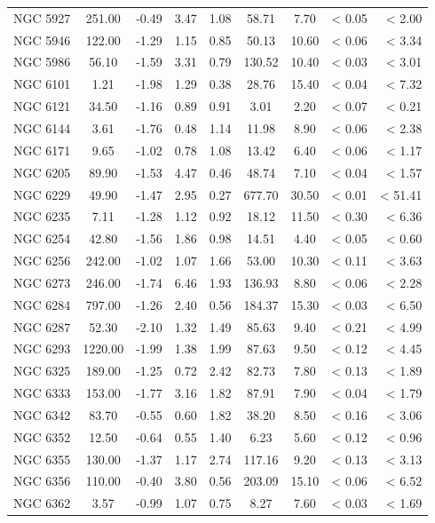 \documentclass[doublespace,nopageskip]{VTthesis} %
\begin{document}
\begin{appendices}
\begin{table}
\begin{tabular}{lcccccccr}
NGC 5927 & 251.00 & -0.49 & 3.47 & 1.08 & 58.71 & 7.70 & < 0.05 & < 2.00\\
NGC 5946 & 122.00 & -1.29 & 1.15 & 0.85 & 50.13 & 10.60 & < 0.06 & < 3.34\\
NGC 5986 & 56.10 & -1.59 & 3.31 & 0.79 & 130.52 & 10.40 & < 0.03 & < 3.01\\
NGC 6101 & 1.21 & -1.98 & 1.29 & 0.38 & 28.76 & 15.40 & < 0.04 & < 7.32\\
NGC 6121 & 34.50 & -1.16 & 0.89 & 0.91 & 3.01 & 2.20 & < 0.07 & < 0.21\\
NGC 6144 & 3.61 & -1.76 & 0.48 & 1.14 & 11.98 & 8.90 & < 0.06 & < 2.38\\
NGC 6171 & 9.65 & -1.02 & 0.78 & 1.08 & 13.42 & 6.40 & < 0.06 & < 1.17\\
NGC 6205 & 89.90 & -1.53 & 4.47 & 0.46 & 48.74 & 7.10 & < 0.04 & < 1.57\\
NGC 6229 & 49.90 & -1.47 & 2.95 & 0.27 & 677.70 & 30.50 & < 0.01 & < 51.41\\
NGC 6235 & 7.11 & -1.28 & 1.12 & 0.92 & 18.12 & 11.50 & < 0.30 & < 6.36\\
NGC 6254 & 42.80 & -1.56 & 1.86 & 0.98 & 14.51 & 4.40 & < 0.05 & < 0.60\\
NGC 6256 & 242.00 & -1.02 & 1.07 & 1.66 & 53.00 & 10.30 & < 0.11 & < 3.63\\
NGC 6273 & 246.00 & -1.74 & 6.46 & 1.93 & 136.93 & 8.80 & < 0.06 & < 2.28\\
NGC 6284 & 797.00 & -1.26 & 2.40 & 0.56 & 184.37 & 15.30 & < 0.03 & < 6.50\\
NGC 6287 & 52.30 & -2.10 & 1.32 & 1.49 & 85.63 & 9.40 & < 0.21 & < 4.99\\
NGC 6293 & 1220.00 & -1.99 & 1.38 & 1.99 & 87.63 & 9.50 & < 0.12 & < 4.45\\
NGC 6325 & 189.00 & -1.25 & 0.72 & 2.42 & 82.73 & 7.80 & < 0.13 & < 1.89\\
NGC 6333 & 153.00 & -1.77 & 3.16 & 1.82 & 87.91 & 7.90 & < 0.04 & < 1.79\\
NGC 6342 & 83.70 & -0.55 & 0.60 & 1.82 & 38.20 & 8.50 & < 0.16 & < 3.06\\
NGC 6352 & 12.50 & -0.64 & 0.55 & 1.40 & 6.23 & 5.60 & < 0.12 & < 0.96\\
NGC 6355 & 130.00 & -1.37 & 1.17 & 2.74 & 117.16 & 9.20 & < 0.13 & < 3.13\\
NGC 6356 & 110.00 & -0.40 & 3.80 & 0.56 & 203.09 & 15.10 & < 0.06 & < 6.52\\
NGC 6362 & 3.57 & -0.99 & 1.07 & 0.75 & 8.27 & 7.60 & < 0.03 & < 1.69\\
\hline
\end{tabular}
\end{table}


\end{appendices}
\end{document}
